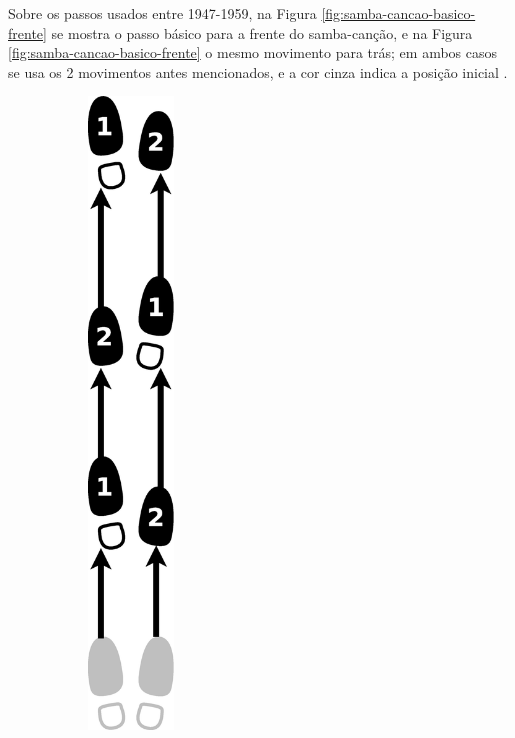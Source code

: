 \begin{itemize}
Sobre os passos usados entre 1947-1959, 
na Figura \ref{fig:samba-cancao-basico-frente} se mostra o passo básico para a frente do samba-canção,
e na  Figura \ref{fig:samba-cancao-basico-frente} o mesmo movimento para trás;
em ambos casos se usa os 2 movimentos antes mencionados, e a cor cinza indica a posição inicial \cite[pp. 51]{fornaciari1947aprender} \cite[pp. 59-60]{freitas1959danca}. 
\begin{figure}[h]
    \centering
    \begin{subfigure}[b]{0.4\textwidth}
        \centering
        \includegraphics[width=0.25\textwidth]{chapters/cap-historia-sambagafieira/samba-cancao-basico-frente.eps}

\end{subfigure}
\end{figure}
\end{itemize}
